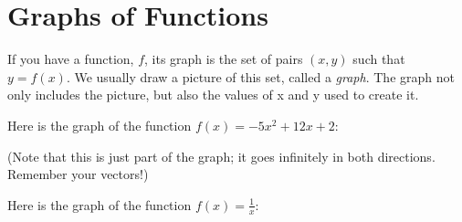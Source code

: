 \section{Graphs of Functions}

If you have a function, $f$, its graph is the set of pairs $(x, y)$
such that $y = f(x)$.  We usually draw a picture of this set, called a \textit{graph}. 
The graph not only includes the picture, but also the values of x and y used to create it.

Here is the graph of the function $f(x) = -5x^2 + 12x + 2$:


(Note that this is just part of the graph; it goes infinitely in both
directions. Remember your vectors!)

Here is the graph of the function $f(x) = \frac{1}{x}$:

